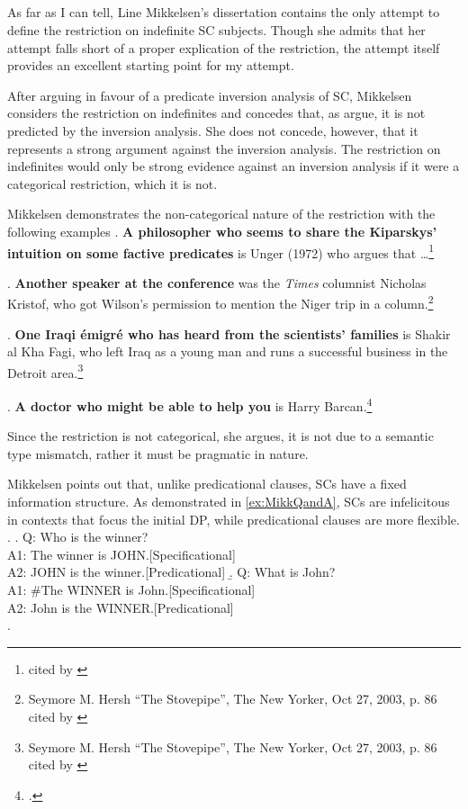 \documentclass[GPFinal]{subfiles}
\begin{document}
\subsection{\textcite{mikkelsen2004specifying}}
As far as I can tell, Line Mikkelsen's dissertation contains the only attempt to define the restriction on indefinite SC subjects.
Though she admits that her attempt falls short of a proper explication of the restriction, the attempt itself provides an excellent starting point for my attempt.

After arguing in favour of a predicate inversion analysis of SC, Mikkelsen considers the restriction on indefinites and concedes that, as \textcite{heycockkroch1999pseudocleft} argue, it is not predicted by the inversion analysis.
She does not concede, however, that it represents a strong argument against the inversion analysis.
The restriction on indefinites would only be strong evidence against an inversion analysis if it were a categorical restriction, which it is not.

Mikkelsen demonstrates the non-categorical nature of the restriction with the following examples
\ex.\label{ex:MikkPhilosopher} \textbf{A philosopher who seems to share the Kiparskys' intuition on some factive predicates} is Unger (1972) who argues that \dots\footnote{\textcite[][p. 195 fn8]{delacruz1976factives} cited by \textcite{mikkelsen2004specifying}}

\ex.\label{ex:MikkSpeaker} \textbf{Another speaker at the conference} was the \textit{Times} columnist Nicholas Kristof, who got Wilson's permission to mention the Niger trip in a column.\footnote{Seymore M. Hersh ``The Stovepipe'', The New Yorker, Oct 27, 2003, p. 86 cited by \textcite{mikkelsen2004specifying}}

\ex.\label{ex:MikkEmigre} \textbf{One Iraqi \'emigr\'e who has heard from the scientists' families} is Shakir al Kha Fagi, who left Iraq as a young man and runs a successful business in the Detroit area.\footnote{Seymore M. Hersh ``The Stovepipe'', The New Yorker, Oct 27, 2003, p. 86 cited by \textcite{mikkelsen2004specifying}}

\ex.\label{ex:MikkBarcan} \textbf{A doctor who might be able to help you} is Harry Barcan.\footcite{mikkelsen2004specifying}

Since the restriction is not categorical, she argues, it is not due to a semantic type mismatch, rather it must be pragmatic in nature.

Mikkelsen points out that, unlike predicational clauses, SCs have a fixed information structure.
As demonstrated in \ref{ex:MikkQandA}, SCs are infelicitous in contexts that focus the initial DP, while predicational clauses are more flexible.
\ex.\label{ex:MikkQandA}
\a. Q: Who is the winner?\\
A1: The winner is JOHN.\hfill[Specificational]\\
A2: JOHN is the winner.\hfill[Predicational]
\b. Q: What is John?\\
A1: \#The WINNER is John.\hfill[Specificational]\\
A2: John is the WINNER.\hfill[Predicational]\\
\z.
\end{document}
